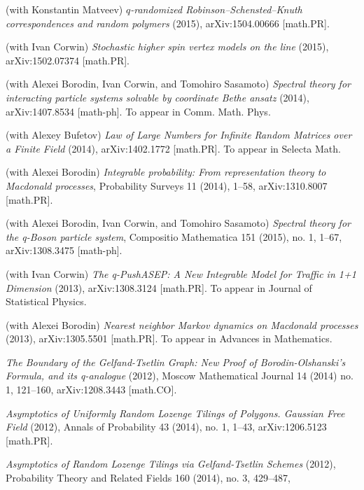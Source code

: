 \documentclass[letterpaper,11pt]{article}
\begin{document}
\begin{etaremune}
    \renewcommand{\labelenumi}{[\theenumi]}
    \item (with Konstantin Matveev)
    \emph{$q$-randomized Robinson--Schensted--Knuth correspondences and random polymers}
    (2015),
    arXiv:1504.00666 [math.PR].
    \item (with Ivan Corwin)
    \emph{Stochastic higher spin vertex models on the line}
    (2015),
    arXiv:1502.07374 [math.PR].
    \item (with Alexei Borodin, Ivan Corwin, and Tomohiro Sasamoto)
    \emph{Spectral theory for interacting particle systems solvable by coordinate Bethe ansatz} (2014), arXiv:1407.8534 [math-ph]. To appear in 
    Comm. Math. Phys.
    \item (with Alexey Bufetov)
    \emph{Law of Large Numbers for Infinite Random Matrices over a Finite Field} (2014), arXiv:1402.1772 [math.PR].
    To appear in Selecta Math.
    \item (with Alexei Borodin) 
    \emph{Integrable probability: From representation theory to Macdonald processes}, 
    Probability Surveys 11 (2014), 1--58, arXiv:1310.8007 [math.PR]. 
    \item (with Alexei Borodin, Ivan Corwin, and Tomohiro Sasamoto)
    \emph{Spectral theory for the q-Boson particle system},
    Compositio Mathematica 151 (2015), no. 1, 1--67,
    arXiv:1308.3475 [math-ph]. 
    \item (with Ivan Corwin)
    \emph{The q-PushASEP: A New Integrable Model for Traffic in 1+1 Dimension} (2013), arXiv:1308.3124 [math.PR]. 
    To appear in Journal of Statistical Physics.
    \item (with Alexei Borodin) 
    \emph{Nearest neighbor Markov dynamics on Macdonald processes} (2013), 
    arXiv:1305.5501 [math.PR].
    To appear in Advances in Mathematics.
    \item \emph{The Boundary of the Gelfand-Tsetlin Graph: New Proof of Borodin-Olshanski's Formula, and its q-analogue} (2012), 
    Moscow Mathematical Journal 14 (2014) no. 1, 121--160,
    arXiv:1208.3443 [math.CO].
    \item \emph{Asymptotics of Uniformly Random Lozenge Tilings of Polygons. Gaussian Free Field} (2012), 
    Annals of Probability 43 (2014), no. 1, 1--43,
    arXiv:1206.5123 [math.PR].
    \item \emph{Asymptotics of Random Lozenge Tilings via Gelfand-Tsetlin Schemes} (2012), 
    Probability Theory and Related Fields 160 (2014), no. 3, 429--487,

\end{etaremune}
\end{document}
